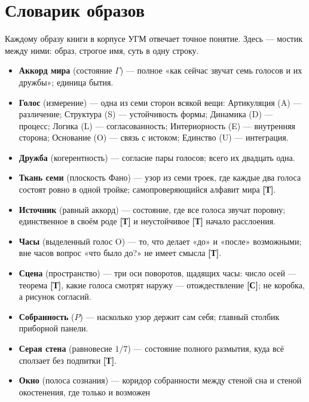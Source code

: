 \documentclass[11pt,letterpaper]{article}
\newcommand{\stT}{\textbf{[Т]}\xspace}
\newcommand{\stC}{\textbf{[С]}\xspace}
\begin{document}
\section*{Словарик образов}

Каждому образу книги в корпусе УГМ отвечает точное понятие. Здесь ---
мостик между ними: образ, строгое имя, суть в одну строку.

\begin{itemize}[leftmargin=1.4em, itemsep=1pt, parsep=0pt]
  \item \textbf{Аккорд мира} (состояние $\Gamma$) --- полное «как
    сейчас звучат семь голосов и их дружбы»; единица бытия.
  \item \textbf{Голос} (измерение) --- одна из семи сторон всякой
    вещи: Артикуляция (A) --- различение; Структура (S) ---
    устойчивость формы; Динамика (D) --- процесс; Логика (L) ---
    согласованность; Интериорность (E) --- внутренняя сторона;
    Основание (O) --- связь с истоком; Единство (U) --- интеграция.
  \item \textbf{Дружба} (когерентность) --- согласие пары голосов;
    всего их двадцать одна.
  \item \textbf{Ткань семи} (плоскость Фано) --- узор из семи троек,
    где каждые два голоса состоят ровно в одной тройке;
    самопроверяющийся алфавит мира \stT.
  \item \textbf{Источник} (равный аккорд) --- состояние, где все
    голоса звучат поровну; единственное в своём роде \stT{} и
    неустойчивое \stT{} начало расслоения.
  \item \textbf{Часы} (выделенный голос O) --- то, что делает «до» и
    «после» возможными; вне часов вопрос «что было до?» не имеет
    смысла \stT.
  \item \textbf{Сцена} (пространство) --- три оси поворотов, щадящих
    часы: число осей --- теорема \stT, какие голоса смотрят наружу ---
    отождествление \stC; не коробка, а рисунок согласий.
  \item \textbf{Собранность} ($P$) --- насколько узор держит сам
    себя; главный столбик приборной панели.
  \item \textbf{Серая стена} (равновесие $1/7$) --- состояние
    полного размытия, куда всё сползает без подпитки \stT.
  \item \textbf{Окно} (полоса сознания) --- коридор собранности
    между стеной сна и стеной окостенения, где только и возможен

\end{itemize}
\end{document}
